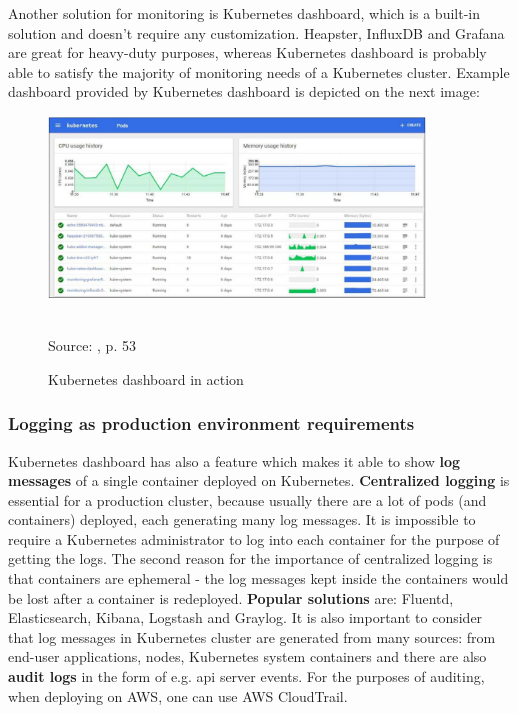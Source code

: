 Another solution for monitoring is Kubernetes dashboard, which is a built-in solution and doesn't require any customization. Heapster, InfluxDB and Grafana are great for heavy-duty purposes, whereas Kubernetes dashboard is probably able to satisfy the majority of monitoring needs of a Kubernetes cluster\cite{book-mastering-k8s}\cite{book-devops-k8s}. Example dashboard provided by Kubernetes dashboard is depicted on the next image:
\begin{figure}[H]
  \centering
  \includegraphics[width=10cm]{figures/k8s-dashboard.png}
  \label{fig:grafana}
  \caption{Kubernetes dashboard in action}
  \\
  \small{Source: \cite{book-mastering-k8s}, p. 53}
\end{figure}

\subsubsection{Logging as production environment requirements}
Kubernetes dashboard has also a feature which makes it able to show \textbf{log messages} of a single container deployed on Kubernetes\cite{book-mastering-k8s}. \textbf{Centralized logging} is essential for a production cluster, because usually there are a lot of pods (and containers) deployed, each generating many log messages. It is impossible to require a Kubernetes administrator to log into each container for the purpose of getting the logs. The second reason for the importance of centralized logging is that containers are ephemeral - the log messages kept inside the containers would be lost after a container is redeployed. \textbf{Popular solutions} are: Fluentd, Elasticsearch, Kibana\cite{book-mastering-k8s}, Logstash\cite{book-devops-k8s} and Graylog\cite{online-prod-year-k8s}\cite{online-graylog}. It is also important to consider that log messages in Kubernetes cluster are generated from many sources: from end-user applications, nodes, Kubernetes system containers and there are also \textbf{audit logs} in the form of e.g. api server events\cite{online-graylog-art}. For the purposes of auditing, when deploying on AWS, one can use AWS CloudTrail\cite{online-ct}.

